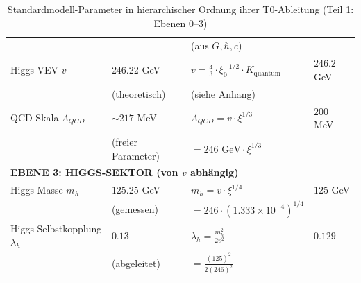\begin{table}[htbp]
{\begin{tabular}{p{5cm}p{3cm}p{2.7cm}p{2.7cm}}
			& & (aus $G, \hbar, c$) & \\[0.3em]
			Higgs-VEV $v$ & $246.22$ GeV & $v = \frac{4}{3} \cdot \xi_0^{-1/2} \cdot K_{\text{quantum}}$ & $246.2$ GeV \\
			& (theoretisch) & (siehe Anhang) & \\[0.3em]
			QCD-Skala $\Lambda_{QCD}$ & $\sim 217$ MeV & $\Lambda_{QCD} = v \cdot \xi^{1/3}$ & $200$ MeV \\
			& (freier Parameter) & $= 246 \text{ GeV} \cdot \xi^{1/3}$ & \\[0.3em]
			\midrule
			\multicolumn{4}{l}{\textbf{EBENE 3: HIGGS-SEKTOR (von $v$ abhängig)}} \\
			\midrule
			Higgs-Masse $m_h$ & $125.25$ GeV & $m_h = v \cdot \xi^{1/4}$ & $125$ GeV \\
			& (gemessen) & $= 246 \cdot (1.333 \times 10^{-4})^{1/4}$ & \\[0.3em]
			Higgs-Selbstkopplung $\lambda_h$ & $0.13$ & $\lambda_h = \frac{m_h^2}{2v^2}$ & $0.129$ \\
			& (abgeleitet) & $= \frac{(125)^2}{2(246)^2}$ & \\[0.3em]
			\bottomrule
		\end{tabular}%
	}
	\caption{Standardmodell-Parameter in hierarchischer Ordnung ihrer T0-Ableitung (Teil 1: Ebenen 0--3)}
	\label{tab:sm-params-1}
\end{table}
